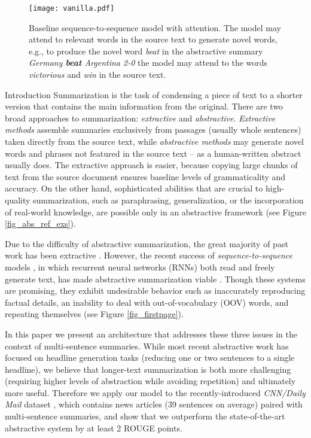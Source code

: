 \documentclass[11pt,a4paper]{article}
\begin{document}
\begin{figure*}[t]
\centering
\texttt{[image: vanilla.pdf]} \caption{Baseline sequence-to-sequence model with attention. The model may attend to relevant words in the source text to generate novel words, e.g., to produce the novel word \textit{beat} in the abstractive summary \textit{Germany \textbf{beat} Argentina 2-0} the model may attend to the words \textit{victorious} and \textit{win} in the source text.}
\label{fig_vanilla_diagram}
\vspace*{-0.5ex}
\end{figure*}

\begin{section}{Introduction}
Summarization is the task of condensing a piece of text to a shorter version that contains the main information from the original.
There are two broad approaches to summarization: \emph{extractive} and \emph{abstractive}.
\textit{Extractive methods} assemble summaries exclusively from
passages (usually whole sentences) taken directly from the source
text, while \textit{abstractive methods} may generate novel words and
phrases not featured in the source text -- as a human-written
abstract usually does.
The extractive approach is easier, because copying large chunks of text from the source document ensures baseline levels of grammaticality and accuracy.
On the other hand, sophisticated abilities that are crucial to high-quality summarization, such as paraphrasing, generalization, or the incorporation of real-world knowledge, are possible only in an abstractive framework (see Figure \ref{fig_abs_ref_exs}).

Due to the difficulty of abstractive summarization, the great majority of past work has been extractive \cite{kupiec1995trainable, paice1990constructing, saggion2013automatic}.
However, the recent success of \textit{sequence-to-sequence} models \cite{sutskever2014sequence}, in which recurrent neural networks (RNNs) both read and freely generate text, has made abstractive summarization viable \cite{chopraabstractive,nallapati2016abstractive,rush2015neural,zeng2016efficient}.
Though these systems are promising, they exhibit undesirable behavior such as inaccurately reproducing factual details, an inability to deal with out-of-vocabulary (OOV) words, and repeating themselves (see Figure \ref{fig_firstpage}).

In this paper we present an architecture that addresses these three 
issues in the context of multi-sentence summaries.
While most recent abstractive work has focused on headline generation
tasks (reducing one or two sentences to a single headline), we believe
that longer-text summarization is both more challenging (requiring
higher levels of abstraction while avoiding repetition) and ultimately more useful.
Therefore we apply our model to the recently-introduced
\textit{CNN\slash Daily Mail} dataset \cite{hermann2015teaching, nallapati2016abstractive}, which contains news articles (39 sentences on average) paired with multi-sentence summaries, and show that we outperform the state-of-the-art abstractive system by at least 2 ROUGE points.


\end{section}
\end{document}
